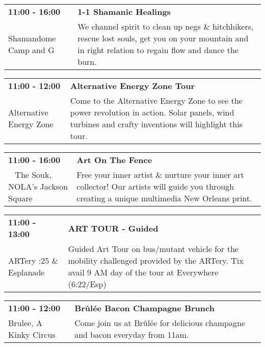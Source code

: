 \begin{tabular}{ p{1in} p{2.2in} }
    \textbf{11:00 - 16:00} & \textbf{1-1 Shamanic Healings} \\
    Shamandome Camp \newline 615 and G & We channel spirit to clean up negs \& hitchhikers, rescue lost souls, get you on your mountain and in right relation to regain flow and dance the burn. \\
    \hline 
\end{tabular}
    
\begin{tabular}{ p{1in} p{2.2in} }
    \textbf{11:00 - 12:00} & \textbf{Alternative Energy Zone Tour} \\
    Alternative Energy Zone \newline  & Come to the Alternative Energy Zone to see the power revolution in action. Solar panels, wind turbines and crafty inventions will highlight this tour. \\
    \hline 
\end{tabular}
    
\begin{tabular}{ p{1in} p{2.2in} }
    \textbf{11:00 - 16:00} & \textbf{Art On The Fence} \\
    ~ \newline The Souk, NOLA's Jackson Square  & Free your inner artist \& nurture your inner art collector! Our artists will guide you through creating a unique multimedia New Orleans print. \\
    \hline 
\end{tabular}
    
\begin{tabular}{ p{1in} p{2.2in} }
    \textbf{11:00 - 13:00} & \textbf{ART TOUR - Guided} \\
    ARTery \newline 6:25 \& Esplanade & Guided Art Tour on bus/mutant vehicle for the mobility challenged provided by the ARTery.  Tix avail 9 AM  day of the tour at Everywhere (6:22/Esp) \\
    \hline 
\end{tabular}
    
\begin{tabular}{ p{1in} p{2.2in} }
    \textbf{11:00 - 12:00} & \textbf{Br\^ul\'ee Bacon Champagne Brunch} \\
    Brulee, A Kinky Circus \newline  & Come join us at Br\^ul\'ee for delicious champagne and bacon everyday from 11am. \\
    \hline 
\end{tabular}
    
